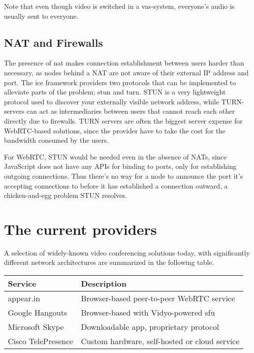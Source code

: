 Note that even though video is switched in a \gls{vas}-system, everyone's audio is usually sent to everyone.

\subsection{NAT and Firewalls}

The presence of \gls{nat} makes connection establishment between users harder than necessary, as nodes behind a NAT are not aware of their external IP address and port. The \gls{ice} framework providers two protocols that can be implemented to alleviate parts of the problem; \gls{stun} and \gls{turn}. STUN is a very lightweight protocol used to discover your externally visible network address, while TURN-servers can act as intermediaries between users that cannot reach each other directly due to firewalls. TURN servers are often the biggest server expense for WebRTC-based solutions, since the provider have to take the cost for the bandwidth consumed by the users.

For WebRTC, STUN would be needed even in the absence of NATs, since JavaScript does not have any APIs for binding to ports, only for establishing outgoing connections. Thus there's no way for a node to announce the port it's accepting connections to before it has established a connection outward, a chicken-and-egg problem STUN resolves.


\section{The current providers}

A selection of widely-known video conferencing solutions today, with significantly different network architectures are summarized in the following table.

\begin{center}
	\label{tab:existing-solutions}
	\begin{tabular}{| l | l |}
		\hline
		\textbf{Service} & \textbf{Description} \\ \hline
		appear.in & Browser-based peer-to-peer WebRTC service \\ \hline
		Google Hangouts & Browser-based with Vidyo-powered \gls{sfu} \\ \hline
		Microsoft Skype & Downloadable app, proprietary protocol \\ \hline
		Cisco TelePresence & Custom hardware, self-hosted or cloud service \\ \hline
	\end{tabular}
\end{center}

